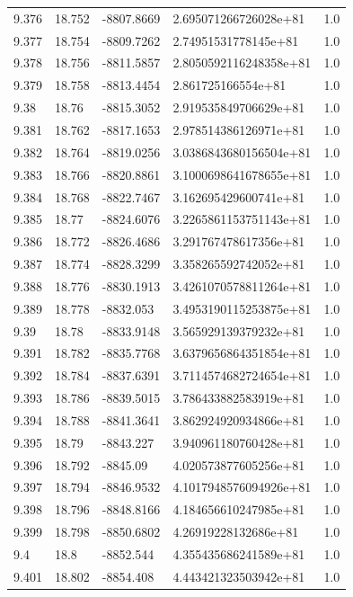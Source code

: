 \begin{tabular}{lllll}
9.376 & 18.752 & -8807.8669 & 2.695071266726028e+81 & 1.0 \\
9.377 & 18.754 & -8809.7262 & 2.74951531778145e+81 & 1.0 \\
9.378 & 18.756 & -8811.5857 & 2.8050592116248358e+81 & 1.0 \\
9.379 & 18.758 & -8813.4454 & 2.861725166554e+81 & 1.0 \\
9.38 & 18.76 & -8815.3052 & 2.919535849706629e+81 & 1.0 \\
9.381 & 18.762 & -8817.1653 & 2.978514386126971e+81 & 1.0 \\
9.382 & 18.764 & -8819.0256 & 3.0386843680156504e+81 & 1.0 \\
9.383 & 18.766 & -8820.8861 & 3.1000698641678655e+81 & 1.0 \\
9.384 & 18.768 & -8822.7467 & 3.162695429600741e+81 & 1.0 \\
9.385 & 18.77 & -8824.6076 & 3.2265861153751143e+81 & 1.0 \\
9.386 & 18.772 & -8826.4686 & 3.291767478617356e+81 & 1.0 \\
9.387 & 18.774 & -8828.3299 & 3.358265592742052e+81 & 1.0 \\
9.388 & 18.776 & -8830.1913 & 3.4261070578811264e+81 & 1.0 \\
9.389 & 18.778 & -8832.053 & 3.4953190115253875e+81 & 1.0 \\
9.39 & 18.78 & -8833.9148 & 3.565929139379232e+81 & 1.0 \\
9.391 & 18.782 & -8835.7768 & 3.6379656864351854e+81 & 1.0 \\
9.392 & 18.784 & -8837.6391 & 3.7114574682724654e+81 & 1.0 \\
9.393 & 18.786 & -8839.5015 & 3.786433882583919e+81 & 1.0 \\
9.394 & 18.788 & -8841.3641 & 3.862924920934866e+81 & 1.0 \\
9.395 & 18.79 & -8843.227 & 3.940961180760428e+81 & 1.0 \\
9.396 & 18.792 & -8845.09 & 4.020573877605256e+81 & 1.0 \\
9.397 & 18.794 & -8846.9532 & 4.1017948576094926e+81 & 1.0 \\
9.398 & 18.796 & -8848.8166 & 4.184656610247985e+81 & 1.0 \\
9.399 & 18.798 & -8850.6802 & 4.26919228132686e+81 & 1.0 \\
9.4 & 18.8 & -8852.544 & 4.355435686241589e+81 & 1.0 \\
9.401 & 18.802 & -8854.408 & 4.443421323503942e+81 & 1.0 \\

\end{tabular}
